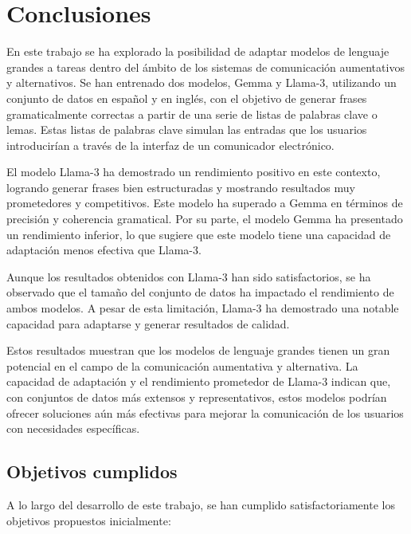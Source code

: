 \documentclass[11pt,spanish,listoffigures,listoftables]{tfgetsinf}
\begin{document}

\chapter{Conclusiones} \label{cap6}

En este trabajo se ha explorado la posibilidad de adaptar modelos de lenguaje grandes a tareas dentro del ámbito de los sistemas de comunicación aumentativos y alternativos. Se han entrenado dos modelos, Gemma y Llama-3, utilizando un conjunto de datos en español y en inglés, con el objetivo de generar frases gramaticalmente correctas a partir de una serie de listas de palabras clave o lemas. Estas listas de palabras clave simulan las entradas que los usuarios introducirían a través de la interfaz de un comunicador electrónico.

El modelo Llama-3 ha demostrado un rendimiento positivo en este contexto, logrando generar frases bien estructuradas y mostrando resultados muy prometedores y competitivos. Este modelo ha superado a Gemma en términos de precisión y coherencia gramatical. Por su parte, el modelo Gemma ha presentado un rendimiento inferior, lo que sugiere que este modelo tiene una capacidad de adaptación menos efectiva que Llama-3.

Aunque los resultados obtenidos con Llama-3 han sido satisfactorios, se ha observado que el tamaño del conjunto de datos ha impactado el rendimiento de ambos modelos. A pesar de esta limitación, Llama-3 ha demostrado una notable capacidad para adaptarse y generar resultados de calidad.

Estos resultados muestran que los modelos de lenguaje grandes tienen un gran potencial en el campo de la comunicación aumentativa y alternativa. La capacidad de adaptación y el rendimiento prometedor de Llama-3 indican que, con conjuntos de datos más extensos y representativos, estos modelos podrían ofrecer soluciones aún más efectivas para mejorar la comunicación de los usuarios con necesidades específicas.

\section{Objetivos cumplidos}

A lo largo del desarrollo de este trabajo, se han cumplido satisfactoriamente los objetivos propuestos inicialmente:
\end{document}
